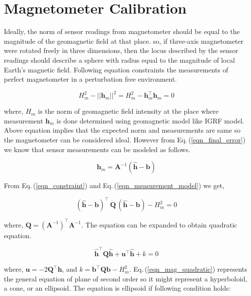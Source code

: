 \documentclass[10pt, a4paper]{article}
\begin{document}
\section{Magnetometer Calibration}
Ideally, the norm of sensor readings from magnetometer should be equal to the magnitude of the geomagnetic field at that place. so, if three-axis magnetometer were rotated freely in three dimensions, then the locus described by the sensor readings should describe a sphere with radius equal to the magnitude of local Earth's magnetic field. Following equation constraints the measurements of perfect magnetometer in a perturbation free environment.

\begin{equation} \label{eqn_constraint}
H_m^2 - |\!| \bm{h}_m |\!|^2 = H_m^2 - \bm{h}_m^{\intercal}\bm{h}_m = 0
\end{equation}

where, $H_m$ is the norm of geomagnetic field intensity at the place where measurement $\bm{h}_m$ is done determined using geomagnetic model like IGRF model. Above equation implies that the expected norm and measurements are same so the magnetometer can be considered ideal. However from Eq.\,(\ref{eqn_final_error}) we know that sensor measurements can be modeled as follows.

\begin{equation} \label{eqn_measurement_model}
\bm{h}_{m} = \bm{A}^{-1} (\hat{\bm{h}} - \bm{b})
\end{equation}

From Eq.\,(\ref{eqn_constraint}) and Eq.\,(\ref{eqn_measurement_model}) we get,

\begin{equation}
(\hat{\bm{h}} - \bm{b})^{\intercal}\,\bm{Q}\,(\hat{\bm{h}} - \bm{b}) - H_m^2  = 0 
\end{equation}

where, $\bm{Q} = (\bm{A}^{-1})^{\intercal}\bm{A}^{-1}$. The equation can be expanded to obtain quadratic equation.

\begin{equation} \label{eqn_mag_quadratic}
\hat{\bm{h}}^{\intercal} \bm{Q} \hat{\bm{h}} + \bm{u}^{\intercal} \hat{\bm{h}} + k = 0
\end{equation}

where, $\bm{u} = -2\bm{Q}^{\intercal}\bm{h}$, and $k = \bm{b}^{\intercal} \bm{Q} \bm{b} - H_{m}^{2}$. Eq.\,(\ref{eqn_mag_quadratic}) represents the general equation of plane of second order so it might represent a hyperboloid, a cone, or an ellipsoid. The equation is ellipsoid if following condition holds:
\end{document}

